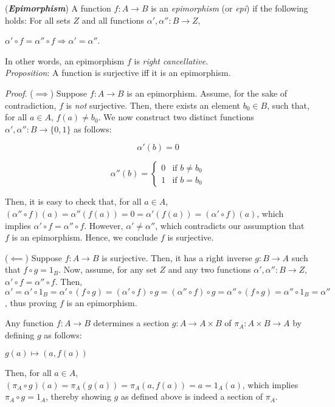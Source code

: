 \begin{xca}
(\emph{\textbf{Epimorphism}}) A function $f : A \to B$ is an \emph{epimorphism}
(or \emph{epi}) if the following holds: For all sets $Z$ and all functions
$\alpha ', \alpha '' : B \to Z$,
\begin{center}
$\alpha ' \circ f = \alpha '' \circ f \Longrightarrow \alpha ' = \alpha ''$.
\end{center}
In other words, an epimorphism $f$ is \emph{right cancellative}.\\

\emph{Proposition}: A function is surjective iff it is an epimorphism.

\emph{Proof}. ($\implies$) Suppose $f: A \to B$ is an epimorphism. Assume, for
the sake of contradiction, $f$ is \emph{not} surjective. Then, there exists an
element $b_0 \in B$, such that, for all $a \in A$, $f(a) \neq b_0$. We now
construct two distinct functions $\alpha', \alpha'' : B \to \{ 0, 1 \}$ as
follows:
\begin{center}
\[
\alpha'(b) = 0
\]

\[
\alpha''(b) =
    \begin{cases}
        0 & \text{if } b \neq b_0 \\
        1 & \text{if } b = b_0
    \end{cases}
\]
\end{center}
Then, it is easy to check that, for all $a \in A$,
$(\alpha'' \circ f)(a) = \alpha''(f(a)) = 0 = \alpha'(f(a)) = (\alpha' \circ
f)(a)$, which implies $\alpha' \circ f = \alpha'' \circ f$. However, $\alpha'
\neq \alpha''$, which contradicts our assumption that $f$ is an epimorphism.
Hence, we conclude $f$ is surjective.

($\impliedby$) Suppose $f: A \to B$ is surjective. Then, it has a right inverse
$g: B \to A$ such that $f \circ g = 1_B$. Now, assume, for any set $Z$ and any
two functions $\alpha', \alpha'': B \to Z$, $\alpha' \circ f = \alpha'' \circ
f$. Then, $\alpha' = \alpha' \circ 1_B = \alpha' \circ (f \circ g) = (\alpha'
\circ f) \circ g = (\alpha'' \circ f) \circ g = \alpha'' \circ (f \circ g) =
\alpha'' \circ 1_B = \alpha''$, thus proving $f$ is an epimorphism.
\end{xca}

\begin{xca}
Any function $f: A \to B$ determines a section $g: A \to A \times B$ of $\pi_A:
A \times B \to A$ by defining $g$ as follows:
\begin{center}
    $g(a) \mapsto (a, f(a))$
\end{center}
Then, for all $a \in A$, $(\pi_A \circ g)(a) = \pi_A(g(a)) = \pi_A(a, f(a)) =
a = 1_A(a)$, which implies $\pi_A \circ g = 1_A$, thereby showing $g$ as
defined above is indeed a section of $\pi_A$.
\end{xca}
